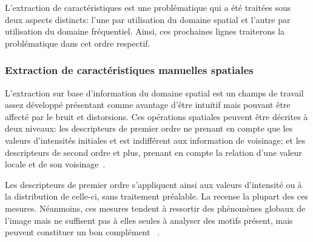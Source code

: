 L'extraction de caractéristiques est une problématique qui a été traitées sous deux aspects distincts: l'une par utilisation du domaine spatial et l'autre par utilisation du domaine fréquentiel. Ainsi, ces prochaines lignes traiterons la problématique dans cet ordre respectif.\par

\subsubsection{Extraction de caractéristiques manuelles spatiales}
L'extraction sur base d'information du domaine spatial est un champs de travail assez développé présentant comme avantage d'être intuitif mais pouvant être affecté par le bruit et distorsions. Ces opérations spatiales peuvent être décrites à deux niveaux: les descripteurs de premier ordre ne prenant en compte que les valeurs d'intensités initiales et est indifférent aux information de voisinage; et les descripteurs de second ordre et plus, prenant en compte la relation d'une valeur locale et de son voisinage~\cite{Kamila2015}.\par

Les descripteurs de premier ordre s'appliquent ainsi aux valeurs d'intensité ou à la distribution de celle-ci, sans traitement préalable. La  recense la plupart des ces mesures. Néanmoins, ces mesures tendent à ressortir des phénomènes globaux de l'image mais ne suffisent pas à elles seules à analyser  des motifs présent, mais peuvent constituer un bon complément ~\cite{Tomita1990, Srinivasan2008}.\par

